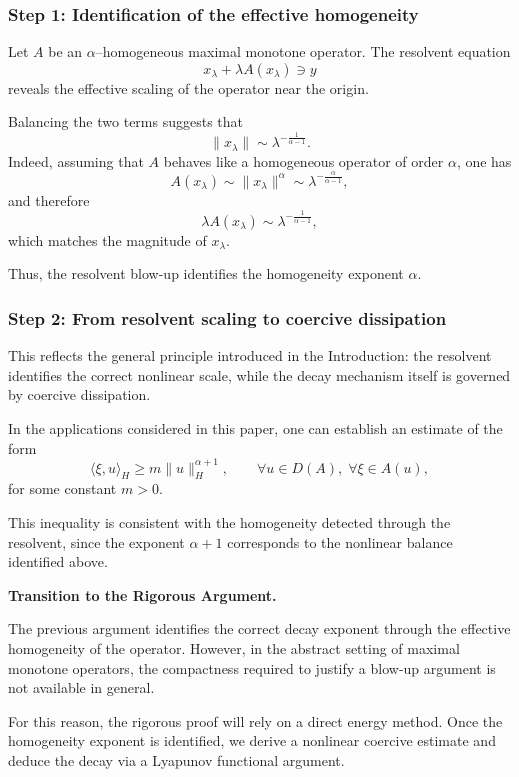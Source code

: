 \documentclass[11pt,reqno]{amsart}
\theoremstyle{remark}
\begin{document}
\subsubsection*{Step 1: Identification of the effective homogeneity}

Let $A$ be an $\alpha$--homogeneous maximal monotone operator. The resolvent equation
\[
x_\lambda+\lambda A(x_\lambda)\ni y
\]
reveals the effective scaling of the operator near the origin.

Balancing the two terms suggests that
\[
\|x_\lambda\| \sim \lambda^{-\frac{1}{\alpha-1}}.
\]
Indeed, assuming that $A$ behaves like a homogeneous operator of order $\alpha$, one has
\[
A(x_\lambda)\sim \|x_\lambda\|^\alpha
\sim \lambda^{-\frac{\alpha}{\alpha-1}},
\]
and therefore
\[
\lambda A(x_\lambda)\sim \lambda^{-\frac{1}{\alpha-1}},
\]
which matches the magnitude of $x_\lambda$.

Thus, the resolvent blow-up identifies the homogeneity exponent $\alpha$.

\medskip
\noindent
\subsubsection*{Step 2: From resolvent scaling to coercive dissipation}
\medskip

This reflects the general principle introduced in the Introduction:
the resolvent identifies the correct nonlinear scale, while the decay
mechanism itself is governed by coercive dissipation.


In the applications considered in this paper, one can establish an estimate of the form
\begin{equation}\label{coercive-abstract}
\langle \xi,u\rangle_H \ge m \|u\|_H^{\alpha+1},
\qquad \forall u\in D(A), \;\forall \xi\in A(u),
\end{equation}
for some constant $m>0$.

This inequality is consistent with the homogeneity detected through the resolvent,
since the exponent $\alpha+1$ corresponds to the nonlinear balance identified above.

\medskip
\noindent
\textbf{Transition to the Rigorous Argument.}

The previous argument identifies the correct decay exponent through the effective
homogeneity of the operator. However, in the abstract setting of maximal monotone
operators, the compactness required to justify a blow-up argument is not available
in general.

For this reason, the rigorous proof will rely on a direct energy method. Once the
homogeneity exponent is identified, we derive a nonlinear coercive estimate and
deduce the decay via a Lyapunov functional argument.
\end{document}
